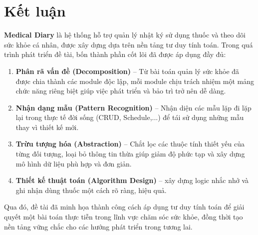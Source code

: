 \documentclass[12pt,a4paper]{report}
\begin{document}
\chapter{Kết luận}

\textbf{Medical Diary} là hệ thống hỗ trợ quản lý nhật ký sử dụng thuốc và theo dõi sức khỏe cá nhân, được xây dựng dựa trên nền tảng tư duy tính toán. Trong quá trình phát triển đề tài, bốn thành phần cốt lõi đã được áp dụng đầy đủ:

\begin{enumerate}[leftmargin=2em, itemsep=4pt]
  \item \textbf{Phân rã vấn đề (Decomposition)} -- Từ bài toán quản lý sức khỏe đã được chia thành các module độc lập, mỗi module chịu trách nhiệm một mảng chức năng riêng biệt giúp việc phát triển và bảo trì trở nên dễ dàng.
  \item \textbf{Nhận dạng mẫu (Pattern Recognition)} -- Nhận diện các mẫu lặp đi lặp lại trong thực tế đời sống (CRUD, Schedule,...) để tái sử dụng những mẫu thay vì thiết kế mới.
  \item \textbf{Trừu tượng hóa (Abstraction)} -- Chắt lọc các thuộc tính thiết yếu của từng đối tượng, loại bỏ thông tin thừa giúp giảm độ phức tạp và xây dựng mô hình dữ liệu phù hợp và đơn giản.
  \item \textbf{Thiết kế thuật toán (Algorithm Design)} -- xây dựng logic nhắc nhở và ghi nhận dùng thuốc một cách rõ ràng, hiệu quả.
\end{enumerate}

\vspace{10pt}
Qua đó, đề tài đã minh họa thành công cách áp dụng tư duy tính toán để giải quyết một bài toán thực tiễn trong lĩnh vực chăm sóc sức khỏe, đồng thời tạo nền tảng vững chắc cho các hướng phát triển trong tương lai.
\end{document}
